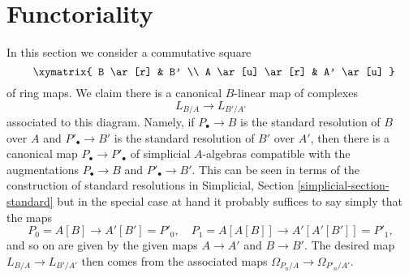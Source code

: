 







\section{Functoriality}
\label{section-functoriality}

\noindent
In this section we consider a commutative square
\begin{equation}
\label{equation-commutative-square}
\vcenter{
\xymatrix{
B \ar[r] & B' \\
A \ar[u] \ar[r] & A' \ar[u]
}
}
\end{equation}
of ring maps. We claim there is a canonical $B$-linear map of complexes
$$
L_{B/A} \longrightarrow L_{B'/A'}
$$
associated to this diagram. Namely, if $P_\bullet \to B$ is the
standard resolution of $B$ over $A$ and $P'_\bullet \to B'$ is the
standard resolution of $B'$ over $A'$, then there is a canonical map
$P_\bullet \to P'_\bullet$
of simplicial $A$-algebras compatible with the augmentations
$P_\bullet \to B$ and $P'_\bullet \to B'$. This can be seen in terms
of the construction of standard resolutions in
Simplicial, Section \ref{simplicial-section-standard}
but in the special case at hand it probably suffices to say simply
that the maps
$$
P_0 = A[B] \longrightarrow A'[B'] = P'_0,\quad
P_1 = A[A[B]] \longrightarrow A'[A'[B']] = P'_1,
$$
and so on are given by the given maps $A \to A'$ and $B \to B'$.
The desired map $L_{B/A} \to L_{B'/A'}$ then comes from the associated
maps $\Omega_{P_n/A} \to \Omega_{P'_n/A'}$.

